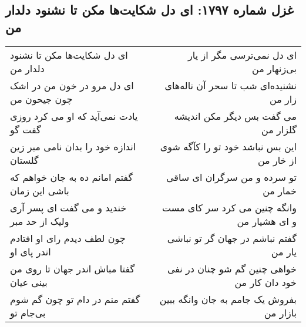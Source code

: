 \begin{center}
\section*{غزل شماره ۱۷۹۷: ای دل شکایت‌ها مکن تا نشنود دلدار من}
\label{sec:1797}
\begin{longtable}{l p{0.5cm} r}
ای دل شکایت‌ها مکن تا نشنود دلدار من
&&
ای دل نمی‌ترسی مگر از یار بی‌زنهار من
\\
ای دل مرو در خون من در اشک چون جیحون من
&&
نشنیده‌ای شب تا سحر آن ناله‌های زار من
\\
یادت نمی‌آید که او می کرد روزی گفت گو
&&
می گفت بس دیگر مکن اندیشه گلزار من
\\
اندازه خود را بدان نامی مبر زین گلستان
&&
این بس نباشد خود تو را کآگه شوی از خار من
\\
گفتم امانم ده به جان خواهم که باشی این زمان
&&
تو سرده و من سرگران ای ساقی خمار من
\\
خندید و می گفت ای پسر آری ولیک از حد مبر
&&
وانگه چنین می کرد سر کای مست و ای هشیار من
\\
چون لطف دیدم رای او افتادم اندر پای او
&&
گفتم نباشم در جهان گر تو نباشی یار من
\\
گفتا مباش اندر جهان تا روی من بینی عیان
&&
خواهی چنین گم شو چنان در نفی خود دان کار من
\\
گفتم منم در دام تو چون گم شوم بی‌جام تو
&&
بفروش یک جامم به جان وانگه ببین بازار من
\\
\end{longtable}
\end{center}
